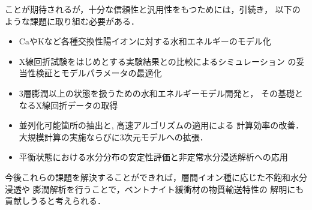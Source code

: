 ﻿\documentclass[11pt,a4j]{jarticle}
\begin{document}
ことが期待されるが，十分な信頼性と汎用性をもつためには，引続き，
以下のような課題に取り組む必要がある．
\begin{itemize}
\item
	CaやKなど各種交換性陽イオンに対する水和エネルギーのモデル化
\item
	X線回折試験をはじめとする実験結果との比較によるシミュレーション
	の妥当性検証とモデルパラメータの最適化
\item
    	3層膨潤以上の状態を扱うための水和エネルギーモデル開発と，
	その基礎となるX線回折データの取得
\item
	並列化可能箇所の抽出と, 高速アルゴリズムの適用による
	計算効率の改善．大規模計算の実施ならびに3次元モデルへの拡張．
\item
	平衡状態における水分分布の安定性評価と非定常水分浸透解析への応用
\end{itemize}
今後これらの課題を解決することができれば，層間イオン種に応じた不飽和水分浸透や
膨潤解析を行うことで，ベントナイト緩衝材の物質輸送特性の
解明にも貢献しうると考えられる．
\end{document}
